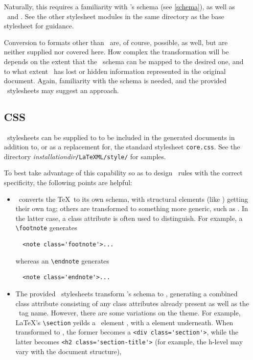 \documentclass{book}
\begin{document}
Naturally, this requires a familiarity with \LaTeXML's schema (see \ref{schema}),
as well as \XSLT\ and \XHTML.  See the other stylesheet modules in the same directory
as the base stylesheet for guidance.

Conversion to formats other than \XHTML\ are, of course, possible, as well,
but are neither supplied nor covered here.
How complex the transformation will be depends on the extent
that the \LaTeXML\ schema can be mapped to the desired one,
and to what extent \LaTeXML\ has lost or hidden information
represented in the original document.  Again, familiarity with the schema is needed,
and the provided \XHTML\ stylesheets may suggest an approach.

\subsection{CSS}\label{customization.latexmlpost.css}
\CSS\ stylesheets can be supplied to  to
be included in the generated documents in addition to, or as a
replacement for, the standard stylesheet \texttt{core.css}.
See the directory
\textit{installationdir}\texttt{/LaTeXML/style/}
for samples.

To best take advantage of this capability so as to design
\CSS\ rules with the correct specificity, the following points are helpful:
\begin{itemize}
\item \LaTeXML\ converts the \TeX\ to its own schema,
  with structural elements (like ) getting their own tag;
  others are transformed to something more generic, such as .
  In the latter case, a class attribute is often used to distinguish.
  For example, a \verb|\footnote| generates
\begin{verbatim}
  <note class='footnote'>...
\end{verbatim}
  whereas an \verb|\endnote| generates
\begin{verbatim}
  <note class='endnote'>...
\end{verbatim}
\item The provided \XSLT\ stylesheets transform \LaTeXML's schema to \XHTML,
  generating a combined class attribute consisting of any class attributes
  already present as well as the \LaTeXML\ tag name.
  However, there are some variations on the theme.
  For example, \LaTeX's \verb|\section| yeilds a \LaTeXML\ element ,
  with a  element underneath.  When transformed to
  \XHTML, the former becomes a \verb|<div class='section'>|,
  while the latter becomes \verb|<h2 class='section-title'>|
 (for example, the h-level may vary with the document structure),
\end{itemize}
\end{document}
